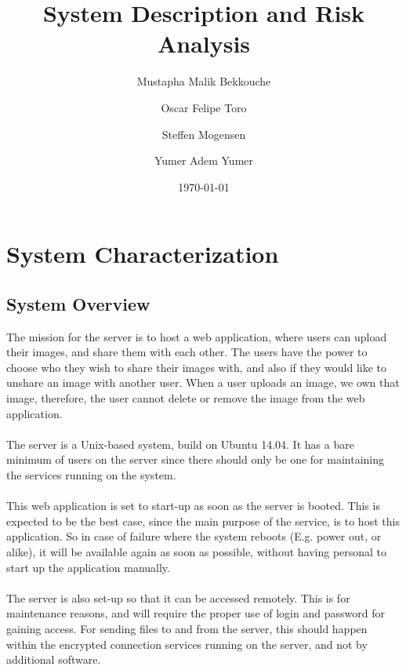 \documentclass{article}
\title{\huge\sffamily\bfseries System Description and Risk Analysis}
\author{Mustapha Malik Bekkouche \and Oscar Felipe Toro \and Steffen Mogensen \and  Yumer Adem Yumer}
\date{\today}
\begin{document}
\maketitle


\tableofcontents
\pagebreak


\section{System Characterization}

\subsection{System Overview}
The mission for the server is to host a web application, where users can upload their images, and share them with each other. The users have the power to choose who they wish to share their images with, and also if they would like to unshare an image with another user. When a user uploads an image, we own that image, therefore, the user cannot delete or remove the image from the web application.\\ \\
The server is a Unix-based system, build on Ubuntu 14.04. It has a bare minimum of users on the server since there should only be one for maintaining the services running on the system.\\ \\
This web application is set to start-up as soon as the server is booted. This is expected to be the best case, since the main purpose of the service, is to host this application. So in case of failure where the system reboots (E.g. power out, or alike), it will be available again as soon as possible, without having personal to start up the application manually.\\ \\
The server is also set-up so that it can be accessed remotely. This is for maintenance reasons, and will require the proper use of login and password for gaining access.
For sending files to and from the server, this should happen within the encrypted connection services running on the server, and not by additional software.
\end{document}
